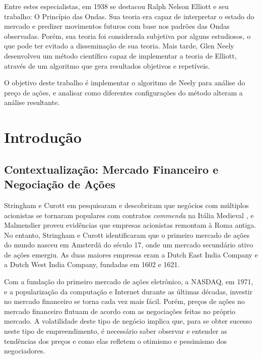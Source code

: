 \documentclass[12pt]{article}
\begin{document}
Entre estes especialistas, em 1938 se destacou Ralph Nelson Elliott e seu trabalho:
O Princípio das Ondas.
Sua teoria era capaz de interpretar o estado do mercado e predizer movimentos futuros com
base nos padrões das Ondas observadas. Porém, sua teoria foi considerada subjetiva por alguns
estudiosos, o que pode ter evitado a disseminação de sua teoria. Mais tarde, Glen Neely
desenvolveu um método científico capaz de implementar a teoria de Elliott, através de um
algoritmo que gera resultados objetivos e repetíveis.

O objetivo deste trabalho é implementar o algoritmo de Neely para análise do preço de ações,
e analisar como diferentes configurações do método alteram a análise resultante.

\newpage


\listoffigures

\listoftables

\newpage

\tableofcontents

\newpage

\section{Introdução}
\subsection{Contextualização: Mercado Financeiro e Negociação de Ações} \label{sec:Stockmarket}

Stringham e Curott em \cite{StringhamCurott:2015} pesquisaram e descobriram que 
negócios com múltiplos acionistas se tornaram populares com contratos \textit{commenda}
na Itália Medieval \cite{Greif:2006}, e Malmendier \cite{Malmendier:2009} proveu evidências
que empresas acionistas remontam à Roma antiga. No entanto, Stringham e Curott identificaram
que o primeiro mercado de ações do mundo nasceu em Amsterdã do século 17, onde um mercado
secundário ativo de ações emergiu. As duas maiores empresas eram a Dutch East India Company
e a Dutch West India Company, fundadas em 1602 e 1621. 

Com a fundação do primeiro mercado de ações eletrônico, a NASDAQ, em 1971, e a popularização
da computação e Internet durante as últimas décadas, investir no mercado financeiro se
torna cada vez mais fácil. Porém, preços de ações no mercado financeiro flutuam de acordo
com as negociações feitas no próprio mercado. A volatilidade deste tipo de negócio implica
que, para se obter sucesso neste tipo de empreendimento, é necessário saber observar e entender
as tendências dos preços e como elas refletem o otimismo e pessimismo dos negociadores.
\end{document}
